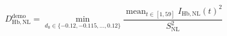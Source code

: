 \documentclass{article}
\begin{document}
\fontsize{22}{29}\selectfont
\[
D_{\mathrm{Hb,NL}}^{\mathrm{demo}}=\min_{d_0\in\{-0.12,-0.115,\ldots,0.12\}}\frac{\operatorname{mean}_{t\in[1,59]} I_{\mathrm{Hb,NL}}(t)^2}{S_{\mathrm{NL}}^2}
\]
\end{document}
